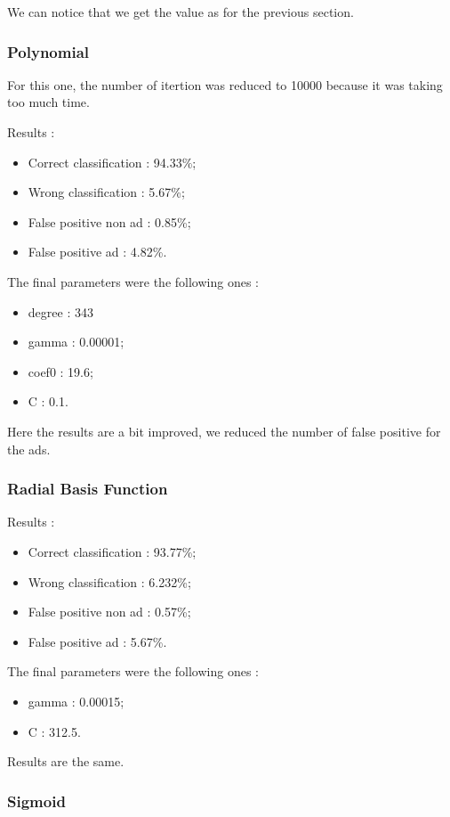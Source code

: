 We can notice that we get the value as for the previous section.

\subsubsection{Polynomial}

For this one, the number of itertion was reduced to 10000 because it was taking too much time.

Results :
\begin{itemize}
  \item Correct classification : 94.33\%;
  \item Wrong classification : 5.67\%;
  \item False positive non ad : 0.85\%;
  \item False positive ad : 4.82\%.
\end{itemize}

The final parameters were the following ones :
\begin{itemize}
  \item degree : 343
  \item gamma : 0.00001;
  \item coef0 : 19.6;
  \item C : 0.1.
\end{itemize}

Here the results are a bit improved, we reduced the number of false positive for the ads.
\subsubsection{Radial Basis Function}

Results :
\begin{itemize}
  \item Correct classification : 93.77\%;
  \item Wrong classification : 6.232\%;
  \item False positive non ad : 0.57\%;
  \item False positive ad : 5.67\%.
\end{itemize}

The final parameters were the following ones :
\begin{itemize}
  \item gamma : 0.00015;
  \item C : 312.5.
\end{itemize}

Results are the same.
\subsubsection{Sigmoid}

